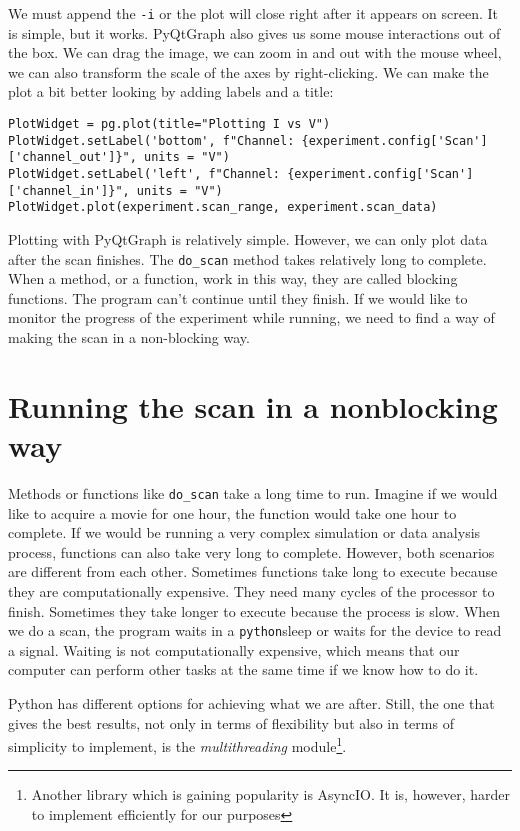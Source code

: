 We must append the \texttt{-i} or the plot will close right after it appears on screen. It is simple, but it works. PyQtGraph also gives us some mouse interactions out of the box. We can drag the image, we can zoom in and out with the mouse wheel, we can also transform the scale of the axes by right-clicking. We can make the plot a bit better looking by adding labels and a title:

\begin{verbatim}
PlotWidget = pg.plot(title="Plotting I vs V")
PlotWidget.setLabel('bottom', f"Channel: {experiment.config['Scan']['channel_out']}", units = "V")
PlotWidget.setLabel('left', f"Channel: {experiment.config['Scan']['channel_in']}", units = "V")
PlotWidget.plot(experiment.scan_range, experiment.scan_data)
\end{verbatim}

Plotting with PyQtGraph is relatively simple. However, we can only plot data after the scan finishes. The \texttt{do\_scan} method takes relatively long to complete. When a method, or a function, work in this way, they are called blocking functions. The program can't continue until they finish. If we would like to monitor the progress of the experiment while running, we need to find a way of making the scan in a non-blocking way.

\section{Running the scan in a nonblocking way}\label{sec:nonblocking}
Methods or functions like \texttt{do\_scan} take a long time to run. Imagine if we would like to acquire a movie for one hour, the function would take one hour to complete. If we would be running a very complex simulation or data analysis process, functions can also take very long to complete. However, both scenarios are different from each other. Sometimes functions take long to execute because they are computationally expensive. They need many cycles of the processor to finish. Sometimes they take longer to execute because the process is slow. When we do a scan, the program waits in a \texttt{python}{sleep} or waits for the device to read a signal. Waiting is not computationally expensive, which means that our computer can perform other tasks at the same time if we know how to do it.

Python has different options for achieving what we are after. Still, the one that gives the best results, not only in terms of flexibility but also in terms of simplicity to implement, is the \emph{multithreading} module\footnote{Another library which is gaining popularity is AsyncIO. It is, however, harder to implement efficiently for our purposes}.

